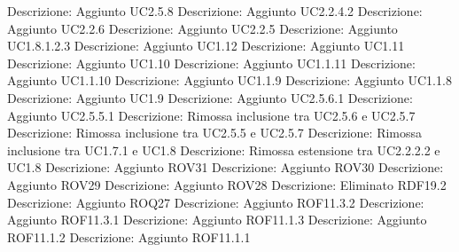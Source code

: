 Descrizione: Aggiunto UC2.5.8 
Descrizione: Aggiunto UC2.2.4.2 
Descrizione: Aggiunto UC2.2.6 
Descrizione: Aggiunto UC2.2.5 
Descrizione: Aggiunto UC1.8.1.2.3 
Descrizione: Aggiunto UC1.12 
Descrizione: Aggiunto UC1.11 
Descrizione: Aggiunto UC1.10 
Descrizione: Aggiunto UC1.1.11 
Descrizione: Aggiunto UC1.1.10 
Descrizione: Aggiunto UC1.1.9 
Descrizione: Aggiunto UC1.1.8 
Descrizione: Aggiunto UC1.9 
Descrizione: Aggiunto UC2.5.6.1 
Descrizione: Aggiunto UC2.5.5.1 
Descrizione: Rimossa inclusione tra UC2.5.6 e UC2.5.7 
Descrizione: Rimossa inclusione tra UC2.5.5 e UC2.5.7 
Descrizione: Rimossa inclusione tra UC1.7.1 e UC1.8 
Descrizione: Rimossa estensione tra UC2.2.2.2 e UC1.8 
Descrizione: Aggiunto ROV31 
Descrizione: Aggiunto ROV30 
Descrizione: Aggiunto ROV29 
Descrizione: Aggiunto ROV28 
Descrizione: Eliminato RDF19.2 
Descrizione: Aggiunto ROQ27 
Descrizione: Aggiunto ROF11.3.2 
Descrizione: Aggiunto ROF11.3.1 
Descrizione: Aggiunto ROF11.1.3 
Descrizione: Aggiunto ROF11.1.2 
Descrizione: Aggiunto ROF11.1.1 
